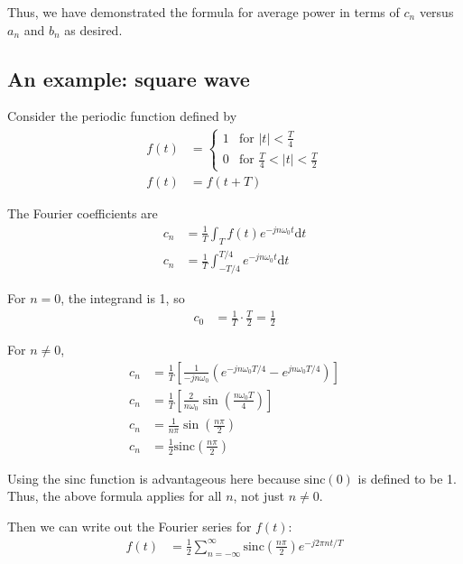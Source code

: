 \documentclass[twocolumn]{myarticle}
\newcommand{\sinc}{\text{sinc}}
\renewcommand{\d}{\mathrm{d}}
\begin{document}
Thus, we have demonstrated the formula for average power in terms of $ c_n $ versus $ a_n $ and $ b_n $ as desired.

\subsection{An example: square wave}
\label{subsec:an_example_square_wave}

Consider the periodic function defined by
\begin{align}
    f(t) &= \begin{cases} 1 & \text{for } |t| < \frac{T}{4} \\ 0 & \text{for } \frac{T}{4} < |t| < \frac{T}{2} \end{cases}
    \\
    f(t) &= f(t + T)
\end{align}

The Fourier coefficients are
\begin{align}
    c_n &= \frac{1}{T} \int_{T} f(t) e^{-j n \omega_0 t} \d t
    \\
    c_n &= \frac{1}{T} \int_{-T/4}^{T/4} e^{-j n \omega_0 t} \d t
\end{align}

For $ n = 0 $, the integrand is 1, so
\begin{align}
    c_0 &= \frac{1}{T} \cdot \frac{T}{2} = \frac{1}{2}
\end{align}

For $ n \neq 0 $,
\begin{align}
    c_n &= \frac{1}{T} \left[ \frac{1}{-j n \omega_0} \left( e^{-j n \omega_0 T/4} - e^{jn \omega_0 T/4} \right) \right]
    \\
    c_n &= \frac{1}{T} \left[ \frac{2}{ n \omega_0} \sin\left(\frac{n \omega_0 T}{4} \right) \right]
    \\
    c_n &= \frac{1}{n \pi} \sin\left(\frac{n \pi}{2} \right)
    \\
    c_n &= \frac{1}{2} \sinc\left(\frac{n \pi}{2} \right)
\end{align}

Using the $ \sinc $ function is advantageous here because $ \sinc(0) $ is defined to be 1. 
Thus, the above formula applies for all $ n $, not just $ n \neq 0 $. 

Then we can write out the Fourier series for $ f(t) $:
\begin{align}
    f(t) &= \frac{1}{2} \sum_{n = -\infty}^{\infty} \sinc \left( \frac{n \pi}{2} \right) e^{- j 2 \pi n t / T}
\end{align}
\end{document}
